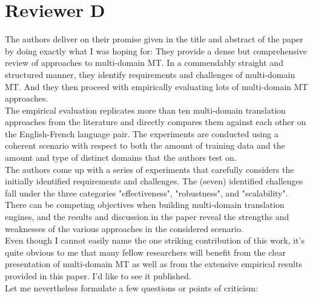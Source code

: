 \documentclass[12pt,times,a4paper,twoside]{article}
\begin{document}
\section*{Reviewer D}
The authors deliver on their promise given in the title and abstract of the paper by doing exactly what I was hoping for: They provide a dense but comprehensive review of approaches to multi-domain MT. In a commendably straight and structured manner, they identify requirements and challenges of multi-domain MT. And they then proceed with empirically evaluating lots of multi-domain MT approaches.
\\
The empirical evaluation replicates more than ten multi-domain translation approaches from the literature and directly compares them against each other on the English-French language pair. The experiments are conducted using a coherent scenario with respect to both the amount of training data and the amount and type of distinct domains that the authors test on.
\\
The authors come up with a series of experiments that carefully considers the initially identified requirements and challenges. The (seven) identified challenges fall under the three categories "effectiveness", "robustness", and "scalability". There can be competing objectives when building multi-domain translation engines, and the results and discussion in the paper reveal the strengths and weaknesses of the various approaches in the considered scenario.
\\
Even though I cannot easily name the one striking contribution of this work, it's quite obvious to me that many fellow researchers will benefit from the clear presentation of multi-domain MT as well as from the extensive empirical results provided in this paper. I'd like to see it published.
\\
Let me nevertheless formulate a few questions or points of criticism:
\end{document}
